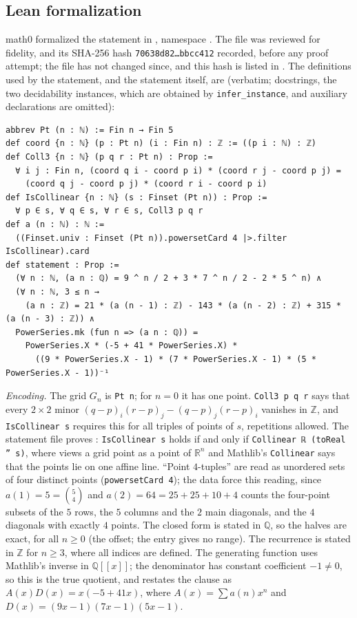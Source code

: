 \documentclass[11pt]{amsart}
\theoremstyle{plain}
\theoremstyle{definition}
\newcommand{\Z}{\mathbb{Z}}
\newcommand{\Q}{\mathbb{Q}}
\newcommand{\R}{\mathbb{R}}
\begin{document}
\subsection*{Lean formalization}
math0 formalized the statement in , namespace . The file was reviewed for fidelity, and its SHA-256 hash \texttt{70638d82\ldots bbcc412} recorded, before any proof attempt; the file has not changed since, and this hash is listed in . The definitions used by the statement, and the statement itself, are (verbatim; docstrings, the two decidability instances, which are obtained by \texttt{infer\_instance}, and auxiliary declarations are omitted):
\begin{lstlisting}[basicstyle=\ttfamily\footnotesize]
abbrev Pt (n : ℕ) := Fin n → Fin 5
def coord {n : ℕ} (p : Pt n) (i : Fin n) : ℤ := ((p i : ℕ) : ℤ)
def Coll3 {n : ℕ} (p q r : Pt n) : Prop :=
  ∀ i j : Fin n, (coord q i - coord p i) * (coord r j - coord p j) =
    (coord q j - coord p j) * (coord r i - coord p i)
def IsCollinear {n : ℕ} (s : Finset (Pt n)) : Prop :=
  ∀ p ∈ s, ∀ q ∈ s, ∀ r ∈ s, Coll3 p q r
def a (n : ℕ) : ℕ :=
  ((Finset.univ : Finset (Pt n)).powersetCard 4 |>.filter IsCollinear).card
def statement : Prop :=
  (∀ n : ℕ, (a n : ℚ) = 9 ^ n / 2 + 3 * 7 ^ n / 2 - 2 * 5 ^ n) ∧
  (∀ n : ℕ, 3 ≤ n →
    (a n : ℤ) = 21 * (a (n - 1) : ℤ) - 143 * (a (n - 2) : ℤ) + 315 * (a (n - 3) : ℤ)) ∧
  PowerSeries.mk (fun n => (a n : ℚ)) =
    PowerSeries.X * (-5 + 41 * PowerSeries.X) *
      ((9 * PowerSeries.X - 1) * (7 * PowerSeries.X - 1) * (5 * PowerSeries.X - 1))⁻¹
\end{lstlisting}

\emph{Encoding.} The grid $G_n$ is \texttt{Pt n}; for $n=0$ it has one point. \texttt{Coll3 p q r} says that every $2\times2$ minor $(q-p)_i(r-p)_j-(q-p)_j(r-p)_i$ vanishes in $\Z$, and \texttt{IsCollinear s} requires this for all triples of points of $s$, repetitions allowed. The statement file proves : \texttt{IsCollinear s} holds if and only if \texttt{Collinear ℝ (toReal '' s)}, where  views a grid point as a point of $\R^n$ and Mathlib's \texttt{Collinear} says that the points lie on one affine line. ``Point $4$-tuples'' are read as unordered sets of four distinct points (\texttt{powersetCard 4}); the data force this reading, since $a(1)=5=\binom54$ and $a(2)=64=25+25+10+4$ counts the four-point subsets of the $5$ rows, the $5$ columns and the $2$ main diagonals, and the $4$ diagonals with exactly $4$ points. The closed form is stated in $\Q$, so the halves are exact, for all $n\ge0$ (the offset; the entry gives no range). The recurrence is stated in $\Z$ for $n\ge3$, where all indices are defined. The generating function uses Mathlib's inverse in $\Q[[x]]$; the denominator has constant coefficient $-1\ne0$, so this is the true quotient, and  restates the clause as $A(x)D(x)=x(-5+41x)$, where $A(x)=\sum a(n)x^n$ and $D(x)=(9x-1)(7x-1)(5x-1)$.
\end{document}
